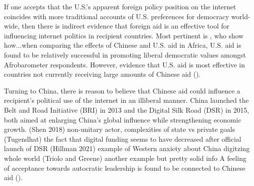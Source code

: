\documentclass[12pt]{article}
\begin{document}
If one accepts that the U.S.'s apparent foreign policy position on the internet coincides with more traditional accounts of U.S. preferences for democracy world-wide, then there is indirect evidence that foreign aid is an effective tool for influencing internet politics in recipient countries. Most pertinent is \cite{blair2022}, who show how...when comparing the effects of Chinese and U.S. aid in Africa, U.S. aid is found to be relatively successful in promoting liberal democratic values amongst Afrobarometer respondents. However, evidence that U.S. aid is most effective in countries not currently receiving large amounts of Chinese aid (\cite{dreher2021}).

Turning to China, there is reason to believe that Chinese aid could influence a recipient's political use of the internet in an illiberal manner. China launched the Belt and Road Initiative (BRI) in 2013 and the Digital Silk Road (DSR) in 2015, both aimed at enlarging China's global influence while strengthening economic growth.
(Shen 2018) non-unitary actor, complexities of state vs private goals
(Tugendhat) the fact that digital funding seems to have decreased after official launch of DSR
(Hillman 2021) example of Western anxiety about China digitzing whole world
(Triolo and Greene) another example but pretty solid info
A feeling of acceptance towards autocratic leadership is found to be connected to Chinese aid (\cite{gehring2022}).


\end{document}
